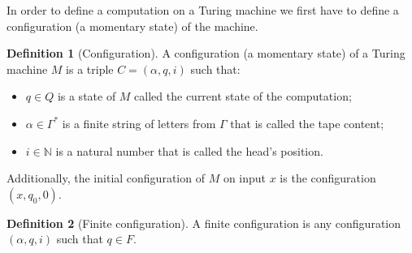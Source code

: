 \documentclass[11pt,a4paper]{article}
\theoremstyle{definition}
\newtheorem{definition}{Definition}[section]
\theoremstyle{plain}
\newcommand{\N}{\mathbb{N}}
\begin{document}
  In order to define a computation on a Turing machine we first have
  to define a configuration (a momentary state) of the machine.

  \begin{definition}[Configuration]
    A configuration (a momentary state) of a Turing machine $M$ is
    a triple $C = (\alpha, q, i)$ such that:
    \begin{itemize}
      \item $q \in Q$ is a state of $M$ called the current state of the
        computation;
      \item $\alpha \in \Gamma^*$ is a finite string of letters from $\Gamma$
        that is called the tape content;
      \item $i \in \N$ is a natural number that is called the head's 
        position.
    \end{itemize}
    Additionally, the initial configuration of $M$ on input $x$ is
    the configuration $(x,q_0,0)$.
  \end{definition}

  \begin{definition}[Finite configuration]
    A finite configuration is any configuration $(\alpha,q,i)$ such that
    $q \in F$.
  \end{definition}

  

  
  
\end{document}
